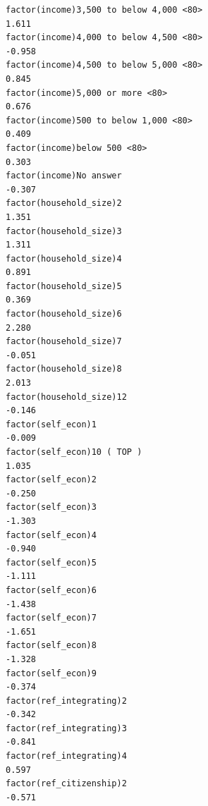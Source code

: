 \documentclass[
]{article}
\begin{document}
\begin{table}
\begin{minipage}[t]{\linewidth}
{\begin{verbatim}
factor(income)3,500 to below 4,000 <80>                                             1.611
factor(income)4,000 to below 4,500 <80>                                            -0.958
factor(income)4,500 to below 5,000 <80>                                             0.845
factor(income)5,000 or more <80>                                                    0.676
factor(income)500 to below 1,000 <80>                                               0.409
factor(income)below 500 <80>                                                        0.303
factor(income)No answer                                                            -0.307
factor(household_size)2                                                             1.351
factor(household_size)3                                                             1.311
factor(household_size)4                                                             0.891
factor(household_size)5                                                             0.369
factor(household_size)6                                                             2.280
factor(household_size)7                                                            -0.051
factor(household_size)8                                                             2.013
factor(household_size)12                                                           -0.146
factor(self_econ)1                                                                 -0.009
factor(self_econ)10 ( TOP )                                                         1.035
factor(self_econ)2                                                                 -0.250
factor(self_econ)3                                                                 -1.303
factor(self_econ)4                                                                 -0.940
factor(self_econ)5                                                                 -1.111
factor(self_econ)6                                                                 -1.438
factor(self_econ)7                                                                 -1.651
factor(self_econ)8                                                                 -1.328
factor(self_econ)9                                                                 -0.374
factor(ref_integrating)2                                                           -0.342
factor(ref_integrating)3                                                           -0.841
factor(ref_integrating)4                                                            0.597
factor(ref_citizenship)2                                                           -0.571

\end{verbatim}}
\end{minipage}
\end{table}
\end{document}
